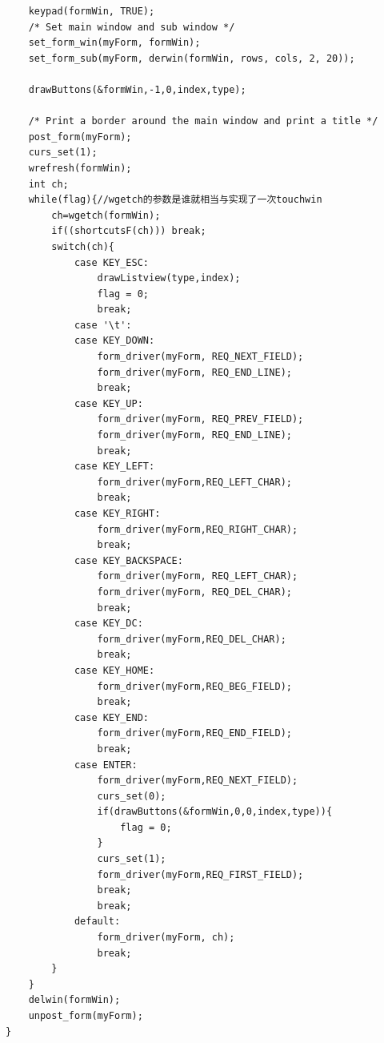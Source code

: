 \documentclass[10pt,a4paper]{article}
\begin{document}
\begin{footnotesize}
\begin{verbatim}
    keypad(formWin, TRUE);
    /* Set main window and sub window */
    set_form_win(myForm, formWin);
    set_form_sub(myForm, derwin(formWin, rows, cols, 2, 20));

    drawButtons(&formWin,-1,0,index,type);

    /* Print a border around the main window and print a title */
    post_form(myForm);
    curs_set(1);
    wrefresh(formWin);
    int ch;
    while(flag){//wgetch的参数是谁就相当与实现了一次touchwin
        ch=wgetch(formWin);
        if((shortcutsF(ch))) break;
        switch(ch){
            case KEY_ESC:
                drawListview(type,index);
                flag = 0;
                break;
            case '\t':
            case KEY_DOWN:
                form_driver(myForm, REQ_NEXT_FIELD);
                form_driver(myForm, REQ_END_LINE);
                break;
            case KEY_UP:
                form_driver(myForm, REQ_PREV_FIELD);
                form_driver(myForm, REQ_END_LINE);
                break;
            case KEY_LEFT:
                form_driver(myForm,REQ_LEFT_CHAR);
                break;
            case KEY_RIGHT:
                form_driver(myForm,REQ_RIGHT_CHAR);
                break;
            case KEY_BACKSPACE:
                form_driver(myForm, REQ_LEFT_CHAR);
                form_driver(myForm, REQ_DEL_CHAR);
                break;
            case KEY_DC:
                form_driver(myForm,REQ_DEL_CHAR);
                break;
            case KEY_HOME:
                form_driver(myForm,REQ_BEG_FIELD);
                break;
            case KEY_END:
                form_driver(myForm,REQ_END_FIELD);
                break;
            case ENTER:
                form_driver(myForm,REQ_NEXT_FIELD);
                curs_set(0);
                if(drawButtons(&formWin,0,0,index,type)){
                    flag = 0;
                }
                curs_set(1);
                form_driver(myForm,REQ_FIRST_FIELD);
                break;
                break;
            default:
                form_driver(myForm, ch);
                break;
        }
    }
    delwin(formWin);
    unpost_form(myForm);
}


\end{verbatim}
\end{footnotesize}
\end{document}
